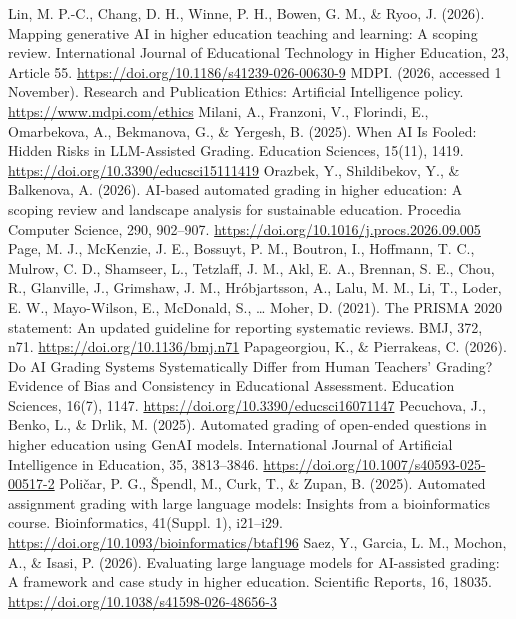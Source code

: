  Lin, M. P.-C., Chang, D. H., Winne, P. H., Bowen, G. M., \& Ryoo, J. (2026). Mapping generative AI in higher education teaching and learning: A scoping review. International Journal of Educational Technology in Higher Education, 23, Article 55. \url{https://doi.org/10.1186/s41239-026-00630-9}
 MDPI. (2026, accessed 1 November). Research and Publication Ethics: Artificial Intelligence policy. \url{https://www.mdpi.com/ethics}
 Milani, A., Franzoni, V., Florindi, E., Omarbekova, A., Bekmanova, G., \& Yergesh, B. (2025). When AI Is Fooled: Hidden Risks in LLM-Assisted Grading. Education Sciences, 15(11), 1419. \url{https://doi.org/10.3390/educsci15111419}
 Orazbek, Y., Shildibekov, Y., \& Balkenova, A. (2026). AI-based automated grading in higher education: A scoping review and landscape analysis for sustainable education. Procedia Computer Science, 290, 902--907. \url{https://doi.org/10.1016/j.procs.2026.09.005}
 Page, M. J., McKenzie, J. E., Bossuyt, P. M., Boutron, I., Hoffmann, T. C., Mulrow, C. D., Shamseer, L., Tetzlaff, J. M., Akl, E. A., Brennan, S. E., Chou, R., Glanville, J., Grimshaw, J. M., Hr\'objartsson, A., Lalu, M. M., Li, T., Loder, E. W., Mayo-Wilson, E., McDonald, S., \ldots{} Moher, D. (2021). The PRISMA 2020 statement: An updated guideline for reporting systematic reviews. BMJ, 372, n71. \url{https://doi.org/10.1136/bmj.n71}
 Papageorgiou, K., \& Pierrakeas, C. (2026). Do AI Grading Systems Systematically Differ from Human Teachers' Grading? Evidence of Bias and Consistency in Educational Assessment. Education Sciences, 16(7), 1147. \url{https://doi.org/10.3390/educsci16071147}
 Pecuchova, J., Benko, L., \& Drlik, M. (2025). Automated grading of open-ended questions in higher education using GenAI models. International Journal of Artificial Intelligence in Education, 35, 3813--3846. \url{https://doi.org/10.1007/s40593-025-00517-2}
 Poli\v{c}ar, P. G., \v{S}pendl, M., Curk, T., \& Zupan, B. (2025). Automated assignment grading with large language models: Insights from a bioinformatics course. Bioinformatics, 41(Suppl. 1), i21--i29. \url{https://doi.org/10.1093/bioinformatics/btaf196}
 Saez, Y., Garcia, L. M., Mochon, A., \& Isasi, P. (2026). Evaluating large language models for AI-assisted grading: A framework and case study in higher education. Scientific Reports, 16, 18035. \url{https://doi.org/10.1038/s41598-026-48656-3}
